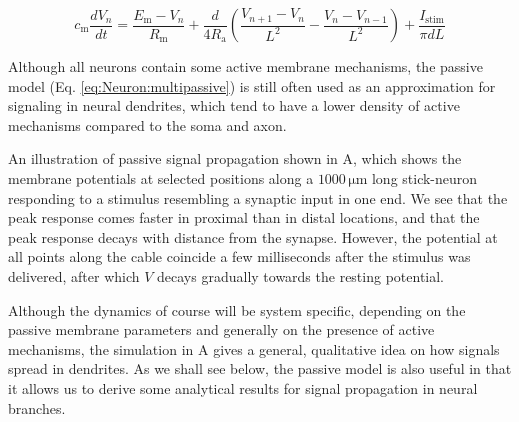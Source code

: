 \begin{equation}
c_\text{m} \frac{dV_n}{dt} = \frac{E_\text{m}-V_n}{R_\text{m}} + \frac{d}{4R_\text{a}}\left(\frac{V_{n+1}-V_n}{L^2} - \frac{V_n-V_{n-1}}{L^2} \right) + \frac{I_\text{stim}}{\pi d L}
\label{eq:Neuron:multipassive}
\end{equation}

Although all neurons contain some active membrane mechanisms, the passive model (Eq. \ref{eq:Neuron:multipassive}) is still often used as an approximation for signaling in neural dendrites, which tend to have a lower density of active mechanisms compared to the soma and axon. 

An illustration of passive signal propagation shown in A, which shows the membrane potentials at selected positions along a $1000 \, \si{\micro\metre}$ long stick-neuron responding to a stimulus resembling a synaptic input in one end. We see that the peak response comes faster in proximal than in distal locations, and that the peak response decays with distance from the synapse. However, the potential at all points along the cable coincide a few milliseconds after the stimulus was delivered, after which $V$  decays gradually towards the resting potential.

Although the dynamics of course will be system specific, depending on the passive membrane parameters and generally on the presence of active mechanisms, the simulation in A gives a general, qualitative idea on how signals spread in dendrites. As we shall see below, the passive model is also useful in that it allows us to derive some analytical results for signal propagation in neural branches.

